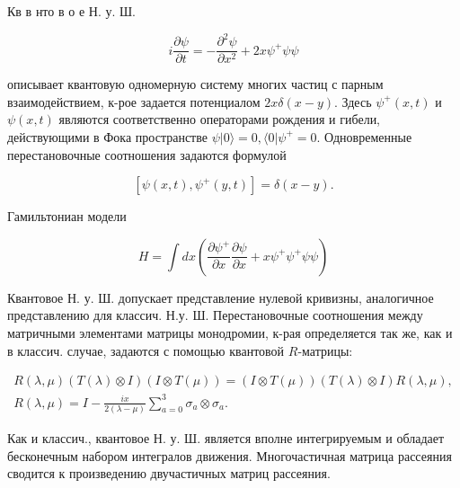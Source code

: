 \documentclass[10pt]{article}
\begin{document}
Кв в нто в о е Н. у. Ш.



\[

i \frac{\partial \psi}{\partial t}=-\frac{\partial^{2} \psi}{\partial x^{2}}+2 x \psi^{+} \psi \psi

\]



описывает квантовую одномерную систему многих частиц с парным взаимодействием, к-рое задается потенциалом $2 x \delta(x-y)$. Здесь $\psi^{+}(x, t)$ и $\psi(x, t)$ являются соответственно операторами рождения и гибели, действующими в Фока пространстве $\psi|0\rangle=0,\langle 0| \psi^{+}=0$. Одновременные перестановочные соотношения задаются формулой



\[

\left[\psi(x, t), \psi^{+}(y, t)\right]=\delta(x-y) .

\]



Гамильтониан модели



\[

H=\int d x\left(\frac{\partial \psi^{+}}{\partial x} \frac{\partial \psi}{\partial x}+x \psi^{+} \psi^{+} \psi \psi\right)

\]



Квантовое Н. у. Ш. допускает представление нулевой кривизны, аналогичное представлению для классич. Н.у. Ш. Перестановочные соотношения между матричными элементами матрицы монодромии, к-рая определяется так же, как и в классич. случае, задаются с помощью квантовой $R$-матрицы:



\[

\begin{gathered}

R(\lambda, \mu)(T(\lambda) \otimes I)(I \otimes T(\mu))=(I \otimes T(\mu))(T(\lambda) \otimes I) R(\lambda, \mu), \\

R(\lambda, \mu)=I-\frac{i x}{2(\lambda-\mu)} \sum_{a=0}^{3} \sigma_{a} \otimes \sigma_{a} .

\end{gathered}

\]



Как и классич., квантовое Н. у. Ш. является вполне интегрируемым и обладает бесконечным набором интегралов движения. Многочастичная матрица рассеяния сводится к произведению двучастичных матриц рассеяния.
\end{document}
